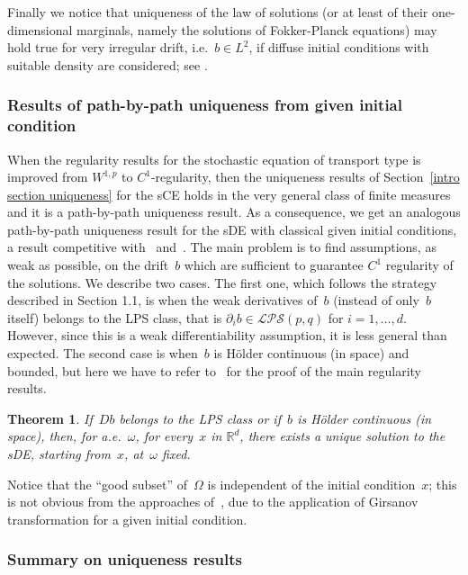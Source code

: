 \documentclass[a4paper,10pt]{article}
\newtheorem{theorem}{Theorem}[section]
\newcommand\1{\mathbbm{1}}
\newcommand{\mr}{\mathbb{R}}
\numberwithin{equation}{section}
\begin{document}
Finally we notice that uniqueness of the law of solutions (or at least of their one-dimensional marginals, namely the solutions of Fokker-Planck equations) may hold true for very irregular drift, i.e.~$b\in L^{2}$, if diffuse initial conditions with suitable density are considered; see \cite{Fig08,BogDaPRoe11}.

\subsubsection{Results of path-by-path uniqueness from given initial condition}

When the regularity results for the stochastic equation of transport type is improved from $W^{1,p}$ to $C^{1}$-regularity, then the uniqueness results of Section~\ref{intro section uniqueness} for the sCE holds in the very general class of finite measures and it is a path-by-path uniqueness result. As a consequence, we get an analogous path-by-path uniqueness result for the sDE with classical given initial conditions, a result competitive with~\cite{DAVIE07} and~\cite{CATGUB13}. The main problem is to find assumptions, as weak as possible, on the drift~$b$ which are sufficient to guarantee $C^{1}$ regularity of the solutions. We describe two cases. The first one, which follows the strategy described in Section 1.1, is when the weak derivatives of~$b$ (instead of only~$b$ itself) belongs to the LPS class, that is $\partial _{i}b\in \mathcal{LPS}( p,q) $ for $i =1,\ldots,d$. However, since this is a weak differentiability assumption, it is less general than expected. The second case is when~$b$ is H\"{o}lder continuous (in space) and bounded, but here we have to refer to~\cite{FLAGUBPRI10,FlGuPr4} for the proof of the main regularity results.

\begin{theorem}
If~$Db$ belongs to the LPS class or if~$b$ is H\"older continuous \textup{(}in space\textup{)}, then, for a.e.~$\omega$, for every~$x$ in $\mr^d$, there exists a unique solution to the sDE, starting from~$x$, at~$\omega$ fixed.
\end{theorem}

Notice that the ``good subset'' of~$\Omega$ is independent of the initial condition~$x$; this is not obvious from the approaches of~\cite{CATGUB13,DAVIE07}, due to the application of Girsanov transformation for a given initial condition.

\subsubsection{Summary on uniqueness results}
\end{document}
